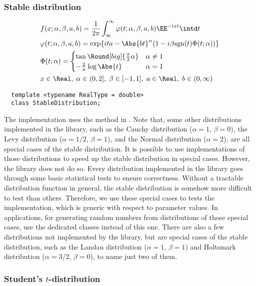 \subsubsection{Stable distribution}
\begin{align*}
  &f(x;\alpha,\beta,a,b) = \frac{1}{2\pi}\int_{\infty}^{\infty}
  \varphi(t;\alpha,\beta,a,b)\EE^{-ixt}\intd t\\
  &\varphi(t;\alpha,\beta,a,b) = \exp\{ita - \Abs{bt}^{\alpha}(1 -
  i\beta\mathrm{sgn}(t)\Phi(t;\alpha))\} \\
  &\Phi(t;\alpha) = \begin{cases}
    \tan\Round[big]{\frac{\pi}{2}\alpha} & \alpha \ne 1 \\
    -\frac{2}{\pi}\log\Abs{t}            & \alpha = 1
  \end{cases} \\
  & x \in \Real,\;
  \alpha \in (0, 2],\; \beta \in [-1, 1],\; a \in \Real,\; b \in (0, \infty)
\end{align*}
\begin{Verbatim}
  template <typename RealType = double>
  class StableDistribution;
\end{Verbatim}
The implementation uses the method in \textcite{Chambers:1976dv}. Note that,
some other distributions implemented in the library, such as the Cauchy
distribution ($\alpha = 1$, $\beta = 0$), the Levy distribution ($\alpha =
1/2$, $\beta = 1$), and the Normal distribution ($\alpha = 2$), are all special
cases of the stable distribution. It is possible to use implementations of
those distributions to speed up the stable distribution in special cases.
However, the library does not do so. Every distribution implemented in the
library goes through some basic statistical tests to ensure correctness.
Without a tractable distribution function in general, the stable distribution
is somehow more difficult to test than others. Therefore, we use these special
cases to tests the implementation, which is generic with respect to parameter
values. In applications, for generating random numbers from distributions of
those special cases, use the dedicated classes instead of this one. There are
also a few distributions not implemented by the library, but are special cases
of the stable distribution, such as the Landau distribution ($\alpha = 1$,
$\beta = 1$) and Holtsmark distribution ($\alpha = 3/2$, $\beta = 0$), to name
just two of them.

\subsubsection{Student's $t$-distribution}


